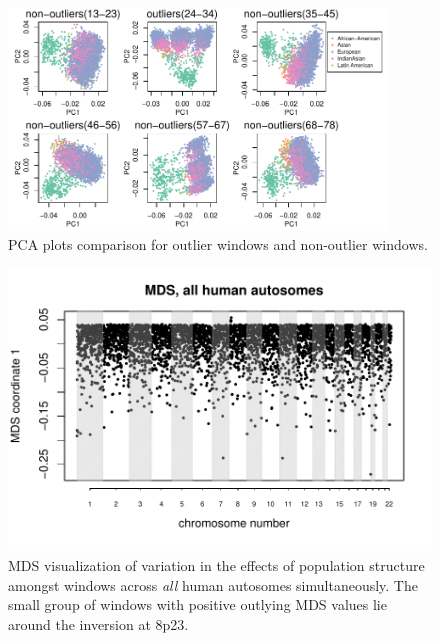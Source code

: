 \documentclass[11pt, oneside]{article}   	%
\begin{document}
\begin{figure}
    \begin{center}
       \includegraphics[width=0.9\textwidth]{FigS_PCA_chr8_outliers_combine_update}
    \end{center}
    \caption{
        PCA plots comparison for outlier windows and non-outlier windows.
        \label{sfig:pca_chr8_outliers}
    }
\end{figure}

\begin{figure}
    \begin{center}
       \includegraphics[width=1\textwidth]{FigS_MDS1D_plot_all_chr_human}
    \end{center}
    \caption{
        MDS visualization of variation in the effects of population structure amongst windows across \emph{all} human autosomes simultaneously.
        The small group of windows with positive outlying MDS values lie around the inversion at 8p23.
        \label{sfig:mds1_along_allchr_human}
    }
\end{figure}
\end{document}
